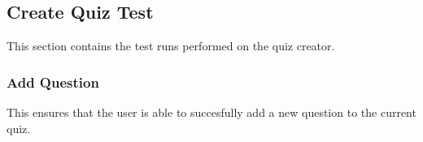 \subsection{Create Quiz Test} %
\label{sub:create_quiz_test}
This section contains the test runs performed on the quiz creator.

\subsubsection{Add Question} %
\label{ssub:add_question}
This ensures that the user is able to succesfully add a new question to the current quiz.

